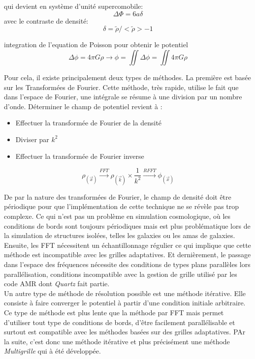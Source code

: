 qui devient en système d'unité supercomobile:
\begin{equation}
\Delta \Phi = 6 a \delta
\end{equation}
avec le contraste de densité: 
\begin{equation}
\delta = \tilde{\rho} / < \tilde{\rho} > - 1 
\end{equation}

integration de l'equation de Poisson pour obtenir le potentiel
\begin{equation}
\Delta \phi = 4\pi G \rho \longrightarrow \phi = \iint \Delta \phi = \iint 4\pi G \rho
\end{equation}

Pour cela, il existe principalement deux types de méthodes. La première est basée sur les Transformées de Fourier. Cette méthode, très rapide, utilise le fait que dans l'espace de Fourier, une intégrale se résume à une division par un nombre d'onde. Déterminer le champ de potentiel revient à : 
\begin{itemize}
\item Effectuer la transformée de Fourier de la densité
\item Diviser par $k^2$
\item Effectuer la transformée de Fourier inverse
\end{itemize}

\begin{equation}
\rho_{(\vec{x})} \overset{FFT}{\longrightarrow}  \rho_{(\vec{k})} \times \frac{1}{k^2}  \overset{RFFT}{\longrightarrow}  \phi_{(\vec{x})}
\end{equation}

De par la nature des transformées de Fourier, le champ de densité doit être périodique pour que l'implémentation de cette technique ne se révèle pas trop complexe. Ce qui n'est pas un problème en simulation cosmologique, où les conditions de bords sont toujours périodiques mais est plus problématique lors de la simulation de structures isolées, telles les galaxies ou les amas de galaxies. Ensuite, les FFT nécessitent un échantillonnage régulier ce qui implique que cette méthode est incompatible avec les grilles adaptatives. Et dernièrement, le passage dans l'espace des fréquences nécessite des conditions de types plans parallèles lors parallélisation, conditions incompatible avec la gestion de grille utilisé par les code AMR dont \emph{Quartz} fait partie. \\

Un autre type de méthode de résolution possible est une méthode itérative. Elle consiste à faire converger le potentiel à partir d'une condition initiale arbitraire. Ce type de méthode est plus lente que la méthode par FFT mais  permet d'utiliser tout type de conditions de bords, d'être facilement parallélisable et surtout est compatible avec les méthodes basées sur des grilles adaptatives. PAr la suite, c'est donc une méthode itérative et plus précisément une méthode \emph{Multigrille} qui à été développée.\\

